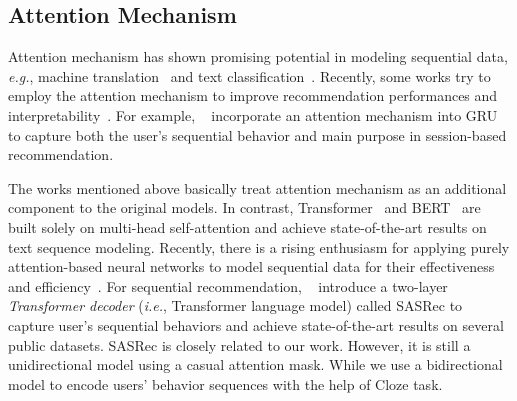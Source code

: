 \subsection{Attention Mechanism}

Attention mechanism has shown promising potential in modeling sequential data, \textit{e.g.}, machine translation~\cite{Bahdanau:iclr2015,Vaswani:nips2017:Attention} and text classification~\cite{Yang:naacl2016:HAN}. Recently, some works try to employ the attention mechanism to improve recommendation performances and interpretability~\cite{Li:cikm2017:NAS,Liu:kdd2018:STAMP}. For example, \citeauthor{Li:cikm2017:NAS}~\cite{Li:cikm2017:NAS} incorporate an attention mechanism into GRU to capture both the user's sequential behavior and main purpose in session-based recommendation.


The works mentioned above basically treat attention mechanism as an additional component to the original models. In contrast, Transformer~\cite{Vaswani:nips2017:Attention} and BERT~\cite{Devlin:2018:BERT} are built solely on multi-head self-attention and achieve state-of-the-art results on text sequence modeling. Recently, there is a rising enthusiasm for applying purely attention-based neural networks to model sequential data for their effectiveness and efficiency~\cite{Lin:iclr2017,Shaw:naacl2018:self,Liu:iclr2018:Generating,Radford:2018:GPT,Radford:2019:Language}. For sequential recommendation, \citeauthor{Kang:ICDM2018:SAS}~\cite{Kang:ICDM2018:SAS} introduce a two-layer \textit{Transformer decoder} (\textit{i.e.}, Transformer language model) called SASRec to capture user's sequential behaviors and achieve state-of-the-art results on several public datasets. SASRec is closely related to our work. However, it is still a unidirectional model using a casual attention mask. While we use a bidirectional model to encode users' behavior sequences with the help of Cloze task.

